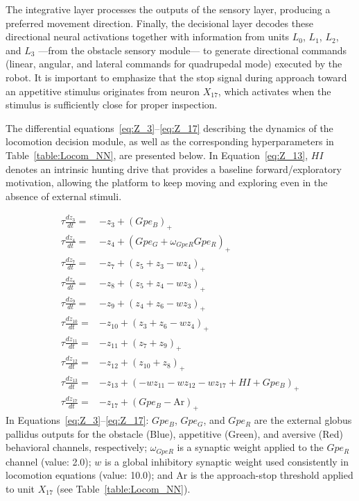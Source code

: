 \documentclass[preprint,12pt]{elsarticle}
\begin{document}
The integrative layer processes the outputs of the sensory layer, producing a preferred movement direction. Finally, the decisional layer decodes these directional neural activations together with information from units $L_0$, $L_1$, $L_2$, and $L_3$ ---from the obstacle sensory module--- to generate directional commands (linear, angular, and lateral commands for quadrupedal mode) executed by the robot. It is important to emphasize that the stop signal during approach toward an appetitive stimulus originates from neuron $X_{17}$, which activates when the stimulus is sufficiently close for proper inspection. 

The differential equations~\eqref{eq:Z_3}–\eqref{eq:Z_17} describing the dynamics of the locomotion decision module, as well as the corresponding hyperparameters in Table~\ref{table:Locom_NN}, are presented below. In Equation~\eqref{eq:Z_13}, $HI$ denotes an intrinsic hunting drive that provides a baseline forward/exploratory motivation, allowing the platform to keep moving and exploring even in the absence of external stimuli.

\begin{align}
\tau \frac{dz_3}{dt} =& -z_3 + (Gpe_{B})_+
\label{eq:Z_3}
\\
\tau \frac{dz_4}{dt} =& -z_4 + (Gpe_{G} + \omega_{GpeR}   Gpe_{R})_+
\\
\tau \frac{dz_7}{dt} =& -z_7 + (z_5 + z_3 - w   z_4)_+
\\
\tau \frac{dz_8}{dt} =& -z_8 + (z_5 + z_4 - w   z_3)_+
\\
\tau \frac{dz_9}{dt} =& -z_9 + (z_4 + z_6 - w   z_3)_+
\\
\tau \frac{dz_{10}}{dt} =& -z_{10} + (z_3 + z_6 - w   z_4)_+
\\
\tau \frac{dz_{11}}{dt} =& -z_{11} + (z_7 + z_9)_+
\\
\tau \frac{dz_{12}}{dt} =& -z_{12} + (z_{10} + z_8)_+
\\
\tau \frac{dz_{13}}{dt} =& -z_{13} + (-w z_{11} - w z_{12}
- w z_{17} + HI + Gpe_{B} )_+
\label{eq:Z_13}
\\
\tau \frac{dz_{17}}{dt} =& -z_{17} + (Gpe_{B} - \text{Ar})_+
\label{eq:Z_17}
\end{align}
In Equations~\eqref{eq:Z_3}–\eqref{eq:Z_17}: $Gpe_B$, $Gpe_G$, and $Gpe_R$ are the external globus pallidus outputs for the obstacle (Blue), appetitive (Green), and aversive (Red) behavioral channels, respectively; $\omega_{GpeR}$ is a synaptic weight applied to the $Gpe_R$ channel (value: 2.0); $w$ is a global inhibitory synaptic weight used consistently in locomotion equations (value: 10.0); and $\text{Ar}$ is the approach-stop threshold applied to unit $X_{17}$ (see Table~\ref{table:Locom_NN}).
\end{document}
